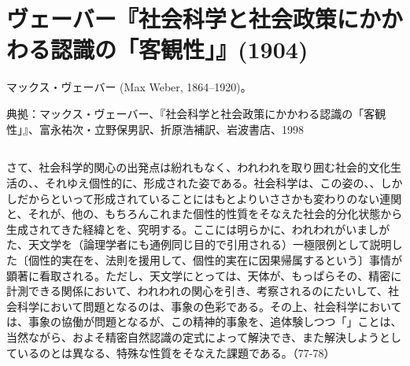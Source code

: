\newpage{}

\section{ヴェーバー『社会科学と社会政策にかかわる認識の「客観性」』(1904)}


マックス・ヴェーバー (Max Weber, 1864--1920)。





典拠：マックス・ヴェーバー、『社会科学と社会政策にかかわる認識の「客観性」』、富永祐次・立野保男訳、折原浩補訳、岩波書店、1998

\subsection{}


さて、社会科学的関心の出発点は紛れもなく、われわれを取り囲む社会的文化生活の、、それゆえ個性的に、形成された姿である。社会科学は、この姿の、、しかしだからといって形成されていることにはもとよりいささかも変わりのない連関と、それが、他の、もちろんこれまた個性的性質をそなえた社会的分化状態から生成されてきた経緯とを、究明する。ここには明らかに、われわれがいましがた、天文学を（論理学者にも通例同じ目的で引用される）一極限例として説明した〔個性的実在を、法則を援用して、個性的実在に因果帰属するという〕事情が顕著に看取される。ただし、天文学にとっては、天体が、もっぱらその、精密に計測できる関係において、われわれの関心を引き、考察されるのにたいして、社会科学において問題となるのは、事象の色彩である。その上、社会科学においては、事象の協働が問題となるが、この精神的事象を、追体験しつつ「」ことは、当然ながら、およそ精密自然認識の定式によって解決でき、また解決しようとしているのとは異なる、特殊な性質をそなえた課題である。（77-78）

\subsection{}



